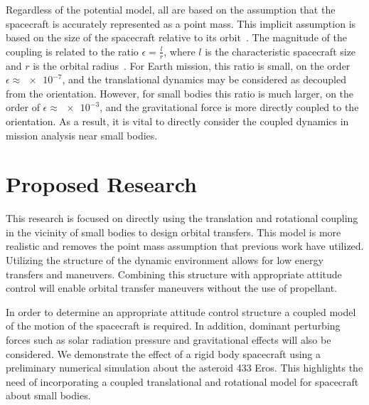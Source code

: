 \documentclass[11pt]{article} %
\begin{document}
Regardless of the potential model, all are based on the assumption that the spacecraft is accurately represented as a point mass.
This implicit assumption is based on the size of the spacecraft relative to its orbit~\cite{hughes2004}.
The magnitude of the coupling is related to the ratio \( \epsilon = \frac{l}{r} \), where \( l \) is the characteristic spacecraft size and \( r \) is the orbital radius~\cite{sincarsin1983}. 
For Earth mission, this ratio is small, on the order \( \epsilon \approx \num{e-7}\), and the translational dynamics may be considered as decoupled from the orientation.
However, for small bodies this ratio is much larger, on the order of \( \epsilon \approx \num{e-3}\), and the gravitational force is more directly coupled to the orientation.
As a result, it is vital to directly consider the coupled dynamics in mission analysis near small bodies.

\section{Proposed Research}
This research is focused on directly using the translation and rotational coupling in the vicinity of small bodies to design orbital transfers.
This model is more realistic and removes the point mass assumption that previous work have utilized. 
Utilizing the structure of the dynamic environment allows for low energy transfers and maneuvers.
Combining this structure with appropriate attitude control will enable orbital transfer maneuvers without the use of propellant.

In order to determine an appropriate attitude control structure a coupled model of the motion of the spacecraft is required.
In addition, dominant perturbing forces such as solar radiation pressure and gravitational effects will also be considered. 
We demonstrate the effect of a rigid body spacecraft using a preliminary numerical simulation about the asteroid 433 Eros.
This highlights the need of incorporating a coupled translational and rotational model for spacecraft about small bodies.
\end{document}
